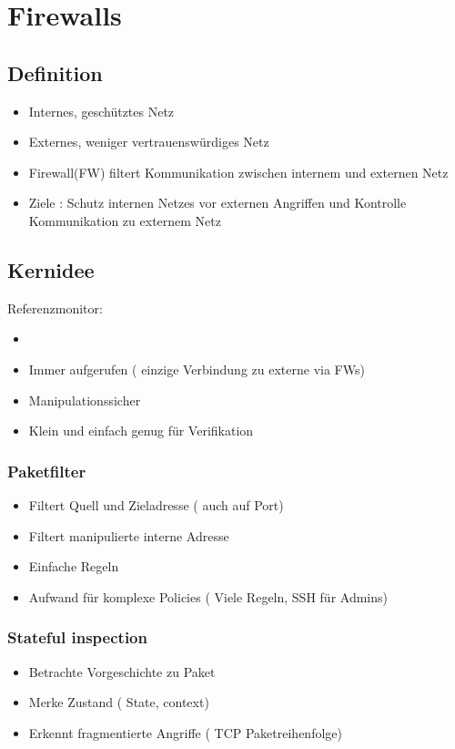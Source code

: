 \section*{Firewalls}

\subsection*{ Definition }
\begin{itemize}
	\item Internes, geschütztes Netz
	\item Externes, weniger vertrauenswürdiges Netz
	\item Firewall(FW) filtert Kommunikation zwischen internem und externen Netz
	\item Ziele : Schutz internen Netzes vor externen Angriffen und Kontrolle Kommunikation zu externem Netz
\end{itemize}

\subsection*{ Kernidee }
Referenzmonitor:
\begin{itemize}
	\item 
	\item Immer aufgerufen ( einzige Verbindung zu externe via FWs)
	\item Manipulationssicher
	\item Klein und einfach genug für Verifikation
\end{itemize}

\subsubsection*{ Paketfilter }
\begin{itemize}
	\item Filtert Quell und Zieladresse ( auch auf Port)
	\item Filtert manipulierte interne Adresse
	\item Einfache Regeln
	\item Aufwand für komplexe Policies ( Viele Regeln, SSH für Admins)
\end{itemize}

\subsubsection*{ Stateful inspection }
\begin{itemize}
	\item Betrachte Vorgeschichte zu Paket
	\item Merke Zustand ( State, context)
	\item Erkennt fragmentierte Angriffe ( TCP Paketreihenfolge)
\end{itemize}

